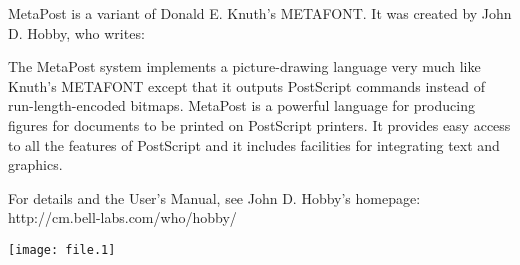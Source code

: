 \documentclass{article}
\begin{document}
MetaPost is a variant of Donald E. Knuth's METAFONT. It was created by John D. Hobby, who writes:

The MetaPost system implements a picture-drawing language very much like Knuth's METAFONT except that it outputs PostScript commands instead of run-length-encoded bitmaps. MetaPost is a powerful language for producing figures for documents to be printed on PostScript printers. It provides easy access to all the features of PostScript and it includes facilities for integrating text and graphics.

For details and the User's Manual, see John D. Hobby's homepage: http://cm.bell-labs.com/who/hobby/

\texttt{[image: file.1]}
\end{document}
